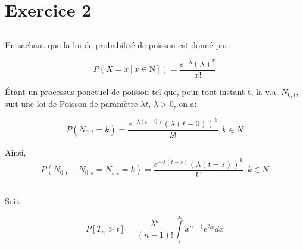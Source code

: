 \documentclass[a4paper]{article}
\begin{document}
\subsection{}
\subsection{}
\subsection{}


\section{Exercice 2 }


\subsection{}
En sachant que la loi de probabilité de poisson est donné par:

\begin{equation}
P(X=x [x \in \mathrm{N}])=\frac{e^{-\lambda }(\lambda )^x}{x!}
\end{equation}

Étant un processus ponctuel de poisson tel que, pour tout instant t, la v.a. $N_{0,t}$,
suit une loi de Poisson de paramètre $\lambda t$, $\lambda >0$, on a:

\begin{equation}
P(N_{0,t}=k)=\frac{e^{-\lambda (t-0)}(\lambda (t-0))^k}{k!} , k \in N
\end{equation}

Ainsi,
\begin{equation}
P(N_{0,t}-N_{0,s}=N_{s,t}=k)=\frac{e^{-\lambda (t-s)}(\lambda (t-s))^k}{k!} , k \in N
\end{equation}

\subsection{}
Soit:

\begin{equation}
P[T_n > t] = \frac{\lambda ^n}{(n - 1)!}\int\limits_t^\infty{x^{n-1}}e^{\lambda x}dx
\end{equation}
\end{document}
